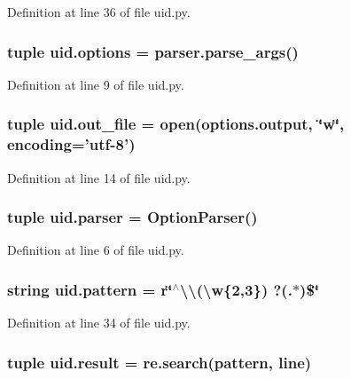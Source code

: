 Definition at line 36 of file uid.\+py.

\hypertarget{namespaceuid_a72496a499a950e7763f54daad4112644}{
\subsubsection[{options}]{\setlength{\rightskip}{0pt plus 5cm}tuple uid.\+options = parser.\+parse\+\_\+args()}}\label{namespaceuid_a72496a499a950e7763f54daad4112644}


Definition at line 9 of file uid.\+py.

\hypertarget{namespaceuid_abafbdda8c90e0befa2cee03e11a2ee22}{
\subsubsection[{out\+\_\+file}]{\setlength{\rightskip}{0pt plus 5cm}tuple uid.\+out\+\_\+file = open(options.\+output, \char`\"{}w\char`\"{}, encoding='utf-\/8')}}\label{namespaceuid_abafbdda8c90e0befa2cee03e11a2ee22}


Definition at line 14 of file uid.\+py.

\hypertarget{namespaceuid_a4039208c718ac9ab3d1a34f9c46376e5}{
\subsubsection[{parser}]{\setlength{\rightskip}{0pt plus 5cm}tuple uid.\+parser = Option\+Parser()}}\label{namespaceuid_a4039208c718ac9ab3d1a34f9c46376e5}


Definition at line 6 of file uid.\+py.

\hypertarget{namespaceuid_a37cd778413aaba0d0e0610ffc35646a2}{
\subsubsection[{pattern}]{\setlength{\rightskip}{0pt plus 5cm}string uid.\+pattern = r\char`\"{}$^\wedge$\textbackslash{}\textbackslash{}(\textbackslash{}w\{2,3\}) ?(.$\ast$)\$\char`\"{}}}\label{namespaceuid_a37cd778413aaba0d0e0610ffc35646a2}


Definition at line 34 of file uid.\+py.

\hypertarget{namespaceuid_a1baa2d4ae8ea6e7427b911466184d548}{
\subsubsection[{result}]{\setlength{\rightskip}{0pt plus 5cm}tuple uid.\+result = re.\+search({\bf pattern}, line)}}\label{namespaceuid_a1baa2d4ae8ea6e7427b911466184d548}


